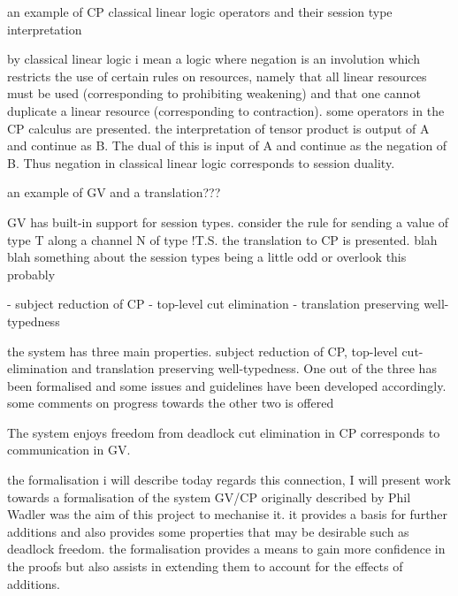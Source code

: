 \documentclass{beamer}
\begin{document}
\begin{frame}
an example of CP classical linear logic operators and their session type
interpretation
\end{frame}

by classical linear logic i mean a logic where negation is an involution which
restricts the use of certain rules on resources, namely that all linear
resources must be used (corresponding to prohibiting weakening) and that one
cannot duplicate a linear resource (corresponding to contraction). some
operators in the CP calculus are presented. the interpretation of tensor
product is output of A and continue as B. The dual of this is input of A and
continue as the negation of B. Thus negation in classical linear logic
corresponds to session duality.

\begin{frame}
an example of GV and a translation???
\end{frame}

GV has built-in support for session types. consider the rule for sending a
value of type T along a channel N of type !T.S. the translation to CP is
presented. blah blah something about the session types being a little odd or
overlook this probably

\begin{frame}
- subject reduction of CP
- top-level cut elimination
- translation preserving well-typedness
\end{frame}

the system has three main properties. subject reduction of CP, top-level
cut-elimination and translation preserving well-typedness. One out of the
three has been formalised and some issues and guidelines have been developed
accordingly. some comments on progress towards the other two is offered

The system
enjoys freedom from deadlock cut elimination in CP corresponds to
communication in GV.

the formalisation i will describe today regards this
connection, I will present work towards a formalisation of the system GV/CP
originally described by Phil Wadler was the aim of this project to mechanise
it. it provides a basis for further additions and also provides some
properties that may be desirable such as deadlock freedom. the formalisation
provides a means to gain more confidence in the proofs but also assists in
extending them to account for the effects of additions.
\end{document}
